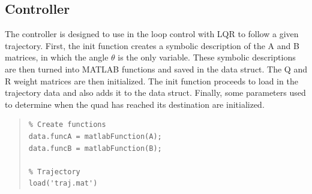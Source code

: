 \documentclass[12pt]{article}
\begin{document}
\subsection{Controller}
The controller is designed to use in the loop control with LQR to follow a given trajectory. First, the init function creates a symbolic description of the A and B matrices, in which the angle $\theta$ is the only variable.  These symbolic descriptions are then turned into MATLAB functions and saved in the data struct.  The Q and R weight matrices are then initialized.  The init function proceeds to load in the trajectory data and also adds it to the data struct.  Finally, some parameters used to determine when the quad has reached its destination are initialized.
\begin{quote}
\begin{lstlisting}
% Create functions
data.funcA = matlabFunction(A);
data.funcB = matlabFunction(B);

% Trajectory
load('traj.mat')
\end{lstlisting}
\end{quote}
\end{document}

